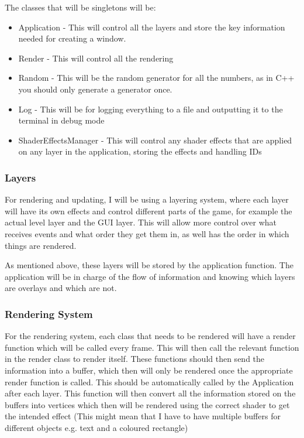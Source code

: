 \documentclass[../Main.tex]{subfiles}
\begin{document}
            The classes that will be singletons will be:
            \begin{itemize}
                \item Application - This will control all the layers and store the key information needed for creating a window.
                \item Render - This will control all the rendering
                \item Random - This will be the random generator for all the numbers, as in C++ you should only generate a generator once.
                \item Log - This will be for logging everything to a file and outputting it to the terminal in debug mode
                \item ShaderEffectsManager - This will control any shader effects that are applied on any layer in the application, storing the effects and handling IDs
            \end{itemize}
        \subsubsection{Layers}
            For rendering and updating, I will be using a layering system, where each layer will have its own effects and control different parts of the game, for example the actual level layer and the GUI layer. This will allow more control over what receives events and what order they get them in, as well has the order in which things are rendered.

            As mentioned above, these layers will be stored by the application function. The application will be in charge of the flow of information and knowing which layers are overlays and which are not.
        \subsubsection{Rendering System}
            For the rendering system, each class that needs to be rendered will have a render function which will be called every frame. This will then call the relevant function in the render class to render itself. These functions should then send the information into a buffer, which then will only be rendered once the appropriate render function is called. This should be automatically called by the Application after each layer. This function will then convert all the information stored on the buffers into vertices which then will be rendered using the correct shader to get the intended effect (This might mean that I have to have multiple buffers for different objects e.g. text and a coloured rectangle)
\end{document}
